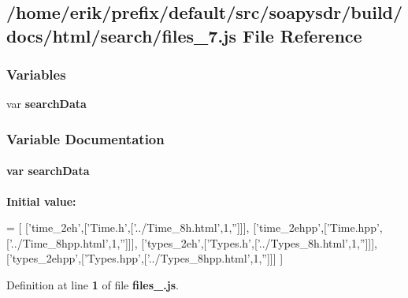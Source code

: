 \subsection{/home/erik/prefix/default/src/soapysdr/build/docs/html/search/files\+\_\+7.js File Reference}
\label{files__7_8js}
\subsubsection*{Variables}
\begin{DoxyCompactItemize}
\item 
var {\bf search\+Data}
\end{DoxyCompactItemize}


\subsubsection{Variable Documentation}
\paragraph[{search\+Data}]{\setlength{\rightskip}{0pt plus 5cm}var search\+Data}\label{files__7_8js_ad01a7523f103d6242ef9b0451861231e}
{\bfseries Initial value\+:}
\begin{DoxyCode}
=
[
  [\textcolor{stringliteral}{'time\_2eh'},[\textcolor{stringliteral}{'Time.h'},[\textcolor{stringliteral}{'../Time\_8h.html'},1,\textcolor{stringliteral}{''}]]],
  [\textcolor{stringliteral}{'time\_2ehpp'},[\textcolor{stringliteral}{'Time.hpp'},[\textcolor{stringliteral}{'../Time\_8hpp.html'},1,\textcolor{stringliteral}{''}]]],
  [\textcolor{stringliteral}{'types\_2eh'},[\textcolor{stringliteral}{'Types.h'},[\textcolor{stringliteral}{'../Types\_8h.html'},1,\textcolor{stringliteral}{''}]]],
  [\textcolor{stringliteral}{'types\_2ehpp'},[\textcolor{stringliteral}{'Types.hpp'},[\textcolor{stringliteral}{'../Types\_8hpp.html'},1,\textcolor{stringliteral}{''}]]]
]
\end{DoxyCode}


Definition at line {\bf 1} of file {\bf files\+\_.\+js}.

